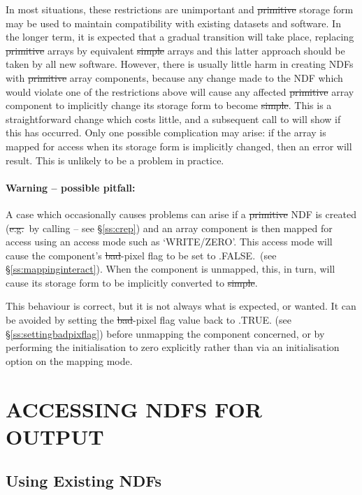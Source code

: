 In most situations, these restrictions are unimportant and \st{primitive\/}
storage form may be used to maintain compatibility with existing datasets
and software. 
In the longer term, it is expected that a gradual transition will take
place, replacing \st{primitive\/} arrays by equivalent \st{simple\/} arrays
and this latter approach should be taken by all new software.
However, there is usually little harm in creating NDFs with
\st{primitive\/} array components, because any change made to the NDF
which 
would violate one of the restrictions above will cause any affected
\st{primitive\/} array component to implicitly change its storage form
to become 
\st{simple}. 
This is a straightforward change which costs little, and a subsequent call
to  will show if this has occurred. 
Only one possible complication may arise: if the array is mapped for access
when its storage form is implicitly changed, then an error will result. 
This is unlikely to be a problem in practice.

\paragraph{Warning -- possible pitfall:} A case which occasionally causes
problems can arise if a \st{primitive\/} NDF is created (\st{e.g.}\ by
calling  -- see \S\ref{ss:crep}) and an array component is then
mapped for access using an access mode such as `WRITE/ZERO'. 
This access mode will cause the component's \st{bad}-pixel flag to be set
to .FALSE.\ (see \S\ref{ss:mappinginteract}). 
When the component is unmapped, this, in turn, will cause its storage form
to be implicitly converted to \st{simple}. 

This behaviour is correct, but it is not always what is expected, or wanted.
It can be avoided by setting the \st{bad}-pixel flag value back to
.TRUE. (see \S\ref{ss:settingbadpixflag}) before unmapping the
component concerned,
or by performing the initialisation to zero explicitly rather than via an
initialisation option on the mapping mode. 


\section{ACCESSING NDFS FOR OUTPUT}

\subsection{Using Existing NDFs}

